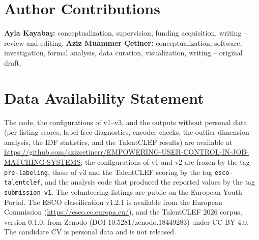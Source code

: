 \documentclass[CHICAGO]{USG}
\begin{document}
\section*{Author Contributions}
\textbf{Ayla Kayaba\c{s}:} conceptualization, supervision, funding acquisition, writing -- review and editing. \textbf{Aziz Muammer \c{C}etiner:} conceptualization, software, investigation, formal analysis, data curation, visualization, writing -- original draft.

\section*{Data Availability Statement}
\makeatletter
\g@addto@macro{\UrlBreaks}{\do\-}%
\makeatother
The code, the configurations of v1--v3, and the outputs without personal data (per-listing scores, label-free diagnostics, encoder checks, the outlier-dimension analysis, the IDF statistics, and the TalentCLEF results) are available at \url{https://github.com/azizcetinerr/EMPOWERING-USER-CONTROL-IN-JOB-MATCHING-SYSTEMS}; the configurations of v1 and v2 are frozen by the tag \texttt{pre-labeling}, those of v3 and the TalentCLEF scoring by the tag \texttt{esco-talentclef}, and the analysis code that produced the reported values by the tag \texttt{submission-v1}. The volunteering listings are public on the European Youth Portal. The ESCO classification v1.2.1 is available from the European Commission (\url{https://esco.ec.europa.eu/}), and the TalentCLEF 2026 corpus, version 0.1.0, from Zenodo (DOI 10.5281/zenodo.18449283) under CC BY 4.0. The candidate CV is personal data and is not released. %


\end{document}

